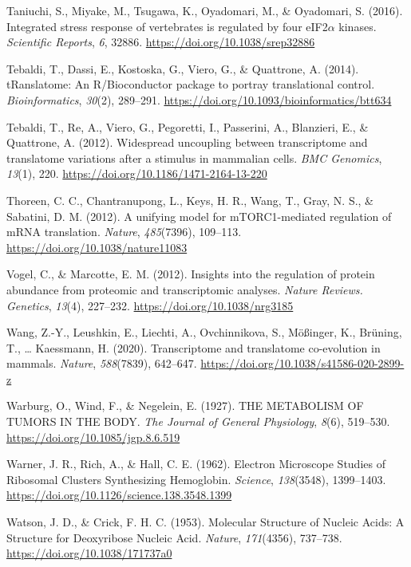 \documentclass[12pt,openany]{book}
\begin{document}
\hypertarget{ref-Taniuchi2016}{}
Taniuchi, S., Miyake, M., Tsugawa, K., Oyadomari, M., \& Oyadomari, S.
(2016). Integrated stress response of vertebrates is regulated by four
eIF2\(\alpha\) kinases. \emph{Scientific Reports}, \emph{6}, 32886.
\url{https://doi.org/10.1038/srep32886}

\hypertarget{ref-Tebaldi2014}{}
Tebaldi, T., Dassi, E., Kostoska, G., Viero, G., \& Quattrone, A.
(2014). tRanslatome: An R/Bioconductor package to portray translational
control. \emph{Bioinformatics}, \emph{30}(2), 289--291.
\url{https://doi.org/10.1093/bioinformatics/btt634}

\hypertarget{ref-Tebaldi2012}{}
Tebaldi, T., Re, A., Viero, G., Pegoretti, I., Passerini, A., Blanzieri,
E., \& Quattrone, A. (2012). Widespread uncoupling between transcriptome
and translatome variations after a stimulus in mammalian cells.
\emph{BMC Genomics}, \emph{13}(1), 220.
\url{https://doi.org/10.1186/1471-2164-13-220}

\hypertarget{ref-Thoreen2012}{}
Thoreen, C. C., Chantranupong, L., Keys, H. R., Wang, T., Gray, N. S.,
\& Sabatini, D. M. (2012). A unifying model for mTORC1-mediated
regulation of mRNA translation. \emph{Nature}, \emph{485}(7396),
109--113. \url{https://doi.org/10.1038/nature11083}

\hypertarget{ref-Vogel2012}{}
Vogel, C., \& Marcotte, E. M. (2012). Insights into the regulation of
protein abundance from proteomic and transcriptomic analyses.
\emph{Nature Reviews. Genetics}, \emph{13}(4), 227--232.
\url{https://doi.org/10.1038/nrg3185}

\hypertarget{ref-Wang2020}{}
Wang, Z.-Y., Leushkin, E., Liechti, A., Ovchinnikova, S., Mößinger, K.,
Brüning, T., \ldots{} Kaessmann, H. (2020). Transcriptome and
translatome co-evolution in mammals. \emph{Nature}, \emph{588}(7839),
642--647. \url{https://doi.org/10.1038/s41586-020-2899-z}

\hypertarget{ref-Warburg1927}{}
Warburg, O., Wind, F., \& Negelein, E. (1927). THE METABOLISM OF TUMORS
IN THE BODY. \emph{The Journal of General Physiology}, \emph{8}(6),
519--530. \url{https://doi.org/10.1085/jgp.8.6.519}

\hypertarget{ref-Warner1962a}{}
Warner, J. R., Rich, A., \& Hall, C. E. (1962). Electron Microscope
Studies of Ribosomal Clusters Synthesizing Hemoglobin. \emph{Science},
\emph{138}(3548), 1399--1403.
\url{https://doi.org/10.1126/science.138.3548.1399}

\hypertarget{ref-Watson1953}{}
Watson, J. D., \& Crick, F. H. C. (1953). Molecular Structure of Nucleic
Acids: A Structure for Deoxyribose Nucleic Acid. \emph{Nature},
\emph{171}(4356), 737--738. \url{https://doi.org/10.1038/171737a0}
\end{document}
